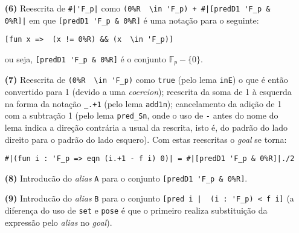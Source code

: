 \begin{enumerate}[label=\textbf{\roman*.}]
\begin{enumerate}[label=\textbf{(\alph*)}]
\begin{enumerate}[label=\textbf{(\alph{enumii}.\arabic*)}]
\begin{enumerate}[listparindent=\parindent]
                                \item[\textbf{(6)}] Reescrita de \lstinline[language=coq]!#|'F_p|! como \lstinline[language=coq]!(0%R  \in 'F_p) + #|[predD1 'F_p & 0%R]|! em que \lstinline[language=coq]![predD1 'F_p & 0%R]! é uma notação para o seguinte:
                                
                                        \begin{lstlisting}[language=coq,frame=single,tabsize=1]
[fun x =>  (x != 0%R) && (x  \in 'F_p)]
                                        \end{lstlisting}
                                ou seja, \lstinline[language=coq]![predD1 'F_p & 0%R]! é o conjunto $\mathbb{F}_p - \{0\}$.

                                \item[\textbf{(7)}] Reescrita de \lstinline[language=coq]!(0%R  \in 'F_p)! como \lstinline[language=coq]!true! (pelo lema \lstinline[language=coq]!inE!) o que é então convertido para 1 (devido a uma \textit{coercion}); reescrita da soma de 1 à esquerda na forma da notação \lstinline[language=coq]!_.+1! (pelo lema \lstinline[language=coq]!add1n!); cancelamento da adição de 1 com a subtração 1 (pelo lema \lstinline[language=coq]!pred_Sn!, onde o uso de \lstinline[language=coq]|-| antes do nome do lema indica a direção contrária a usual da rescrita, isto é, do padrão do lado direito para o padrão do lado esquero). Com estas reescritas o \textit{goal} se torna:
                                        \begin{lstlisting}[language=coq,frame=single,tabsize=1]
#|(fun i : 'F_p => eqn (i.+1 - f i) 0)| = #|[predD1 'F_p & 0%R]|./2
                                        \end{lstlisting}
                                
                                \item[\textbf{(8)}] Introducão do \textit{alias} \lstinline[language=coq]|A| para o conjunto \lstinline[language=coq]|[predD1 'F_p & 0%R]|.
                                
                                \item[\textbf{(9)}] Introducão do \textit{alias} \lstinline[language=coq]|B| para o conjunto \lstinline[language=coq]![pred i |  (i : 'F_p) < f i]! (a diferença do uso de \lstinline[language=coq]|set| e \lstinline[language=coq]|pose| é que o primeiro realiza substituição da expressão pelo \textit{alias} no \textit{goal}).
                                

\end{enumerate}
\end{enumerate}
\end{enumerate}
\end{enumerate}
